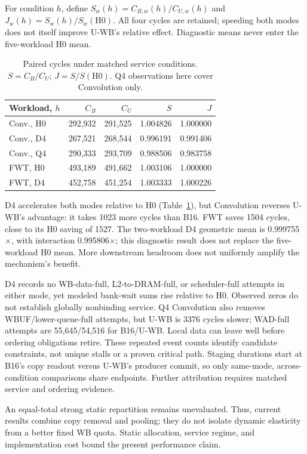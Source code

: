 \documentclass[conference,letterpaper]{IEEEtran}
\begin{document}
For condition $h$, define $S_w(h)=C_{B,w}(h)/C_{U,w}(h)$ and $J_w(h)=S_w(h)/S_w(\mathrm{H0})$. All four cycles are retained; speeding both modes does not itself improve U-WB's relative effect. Diagnostic means never enter the five-workload H0 mean.

\begin{table}[t]
\caption{Paired cycles under matched service conditions. $S=C_B/C_U$; $J=S/S(\mathrm{H0})$. Q4 observations here cover Convolution only.}
\label{tab:downstreamresults}\centering\footnotesize
\begin{tabular}{@{}lrrrr@{}}
\toprule
Workload, $h$ & $C_B$ & $C_U$ & $S$ & $J$ \\
\midrule
Conv., H0 & 292,932 & 291,525 & 1.004826 & 1.000000 \\
Conv., D4 & 267,521 & 268,544 & 0.996191 & 0.991406 \\
Conv., Q4 & 290,333 & 293,709 & 0.988506 & 0.983758 \\
FWT, H0 & 493,189 & 491,662 & 1.003106 & 1.000000 \\
FWT, D4 & 452,758 & 451,254 & 1.003333 & 1.000226 \\
\bottomrule
\end{tabular}
\end{table}

D4 accelerates both modes relative to H0 (Table~\ref{tab:downstreamresults}), but Convolution reverses U-WB's advantage: it takes 1023 more cycles than B16. FWT saves 1504 cycles, close to its H0 saving of 1527. The two-workload D4 geometric mean is 0.999755$\times$, with interaction 0.995806$\times$; this diagnostic result does not replace the five-workload H0 mean. More downstream headroom does not uniformly amplify the mechanism's benefit.

D4 records no WB-data-full, L2-to-DRAM-full, or scheduler-full attempts in either mode, yet modeled bank-wait sums rise relative to H0. Observed zeros do not establish globally nonbinding service. Q4 Convolution also removes WBUF/lower-queue-full attempts, but U-WB is 3376 cycles slower; WAD-full attempts are 55,645/54,516 for B16/U-WB. Local data can leave well before ordering obligations retire. These repeated event counts identify candidate constraints, not unique stalls or a proven critical path. Staging durations start at B16's copy readout versus U-WB's producer commit, so only same-mode, across-condition comparisons share endpoints. Further attribution requires matched service and ordering evidence.


An equal-total strong static repartition remains unevaluated. Thus, current results combine copy removal and pooling; they do not isolate dynamic elasticity from a better fixed WB quota. Static allocation, service regime, and implementation cost bound the present performance claim.
\end{document}
